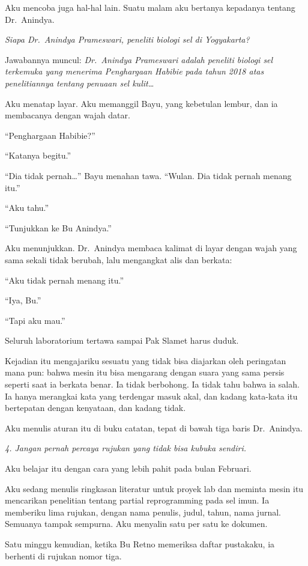 \documentclass[11pt,twoside,openany]{book}
\makeatletter
\newcommand{\scenebreak}{\par\vspace{0.9em}{\centering\textsc{*\hspace{0.7em}*\hspace{0.7em}*}\par}\vspace{0.9em}\@afterindentfalse\@afterheading}
\makeatother
\begin{document}
Aku mencoba juga hal-hal lain. Suatu malam aku bertanya kepadanya tentang Dr.~Anindya.

\emph{Siapa Dr.~Anindya Prameswari, peneliti biologi sel di Yogyakarta?}

Jawabannya muncul: \emph{Dr.~Anindya Prameswari adalah peneliti biologi sel terkemuka yang menerima Penghargaan Habibie pada tahun 2018 atas penelitiannya tentang penuaan sel kulit\ldots{}}

Aku menatap layar. Aku memanggil Bayu, yang kebetulan lembur, dan ia membacanya dengan wajah datar.

``Penghargaan Habibie?''

``Katanya begitu.''

``Dia tidak pernah\ldots{}'' Bayu menahan tawa. ``Wulan. Dia tidak pernah menang itu.''

``Aku tahu.''

``Tunjukkan ke Bu Anindya.''

Aku menunjukkan. Dr.~Anindya membaca kalimat di layar dengan wajah yang sama sekali tidak berubah, lalu mengangkat alis dan berkata:

``Aku tidak pernah menang itu.''

``Iya, Bu.''

``Tapi aku mau.''

Seluruh laboratorium tertawa sampai Pak Slamet harus duduk.

Kejadian itu mengajariku sesuatu yang tidak bisa diajarkan oleh peringatan mana pun: bahwa mesin itu bisa mengarang dengan suara yang sama persis seperti saat ia berkata benar. Ia tidak berbohong. Ia tidak tahu bahwa ia salah. Ia hanya merangkai kata yang terdengar masuk akal, dan kadang kata-kata itu bertepatan dengan kenyataan, dan kadang tidak.

Aku menulis aturan itu di buku catatan, tepat di bawah tiga baris Dr.~Anindya.

\emph{4. Jangan pernah percaya rujukan yang tidak bisa kubuka sendiri.}

\scenebreak
Aku belajar itu dengan cara yang lebih pahit pada bulan Februari.

Aku sedang menulis ringkasan literatur untuk proyek lab dan meminta mesin itu mencarikan penelitian tentang partial reprogramming pada sel imun. Ia memberiku lima rujukan, dengan nama penulis, judul, tahun, nama jurnal. Semuanya tampak sempurna. Aku menyalin satu per satu ke dokumen.

Satu minggu kemudian, ketika Bu Retno memeriksa daftar pustakaku, ia berhenti di rujukan nomor tiga.
\end{document}
